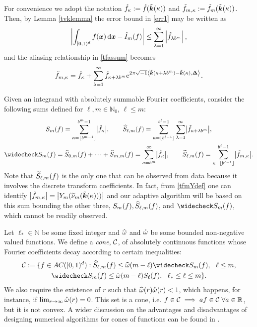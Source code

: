 \documentclass[graybox]{svmult}
\newcommand{\R}{\mathbb{R}} %
\newcommand{\N}{\mathbb{N}} %
\newcommand{\bsx}{\boldsymbol{x}}    %
\newcommand{\bsDelta}{\boldsymbol{\Delta}}    %
\begin{document}
For convenience we adopt the notation $\hat{f}_{\kappa} :=\hat{f}(\tilde{\boldsymbol{k}}(\kappa))$ and $\tilde{f}_{m,\kappa} := \tilde{f}_m(\tilde{\boldsymbol{k}}(\kappa))$. Then, by Lemma  \ref{tvklemma} the error bound in \eqref{err1} may be written as
\begin{equation}
\biggabs{ \int_{\cube} f(\bsx) \, \D \bsx - \hI_m(f)} 
\le \sum_{\lambda=1}^{\infty} \left \lvert \hf_{\lambda b^m}\right \rvert, \label{err2}
\end{equation}
and the aliasing relationship in \eqref{tfassum} becomes
\begin{align}
\tf_{m,\kappa} =\hf_{\kappa} + \sum_{\lambda=1}^{\infty} \hf_{\kappa+\lambda b^{m}} \E^{2 \pi \sqrt{-1} \ip{\tvk(\kappa+\lambda b^{m}) - \tvk(\kappa)}{\bsDelta}}. \label{tfassumc}
\end{align}

Given an integrand with absolutely summable Fourier coefficients, consider the following sums defined for $\ell,m \in \N_0$, $\ell \le m$:
\begin{gather*}
S_m(f) =  \sum_{\kappa=\left \lfloor b^{m-1} \right \rfloor}^{b^{m}-1} \bigabs{\hf_{\kappa}}, \qquad 
\hS_{\ell,m}(f)  = \sum_{\kappa=\left \lfloor b^{\ell-1} \right \rfloor}^{b^{\ell}-1} \sum_{\lambda=1}^{\infty} \bigabs{ \hf_{\kappa+\lambda b^{m}}}, \\
\wcS_m(f)=\hS_{0,m}(f) + \cdots + \hS_{m,m}(f)=
\sum_{\kappa=b^{m}}^{\infty} \bigabs{\hf_{\kappa}}, \qquad
\tS_{\ell,m}(f) = \sum_{\kappa=\left \lfloor b^{\ell-1}\right \rfloor}^{b^{\ell}-1} \bigabs{\tf_{m,\kappa}}.
\end{gather*}
Note that $\widetilde{S}_{\ell,m}(f)$ is the only one that can be observed from data because it involves the discrete transform coefficients. In fact, from \eqref{tfmYdef} one can identify $\bigl \lvert \tilde{f}_{m,\kappa} \bigr \rvert = \bigl \lvert Y_m(\widetilde{\nu}_m(\tilde{\boldsymbol{k}}(\kappa))) \bigr \rvert$ and our adaptive algorithm will be based on this sum bounding the other three, $S_m(f),\widehat{S}_{\ell,m}(f)$, and $\wcS_m(f)$, which cannot be readily observed. 

Let  $\ell_* \in \N$ be some fixed integer and $\widehat{\omega}$ and $\mathring{\omega}$ be some bounded non-negative valued functions.  We define a \emph{cone}, $\mathcal{C}$, of absolutely continuous functions whose Fourier coefficients decay according to certain inequalities:
\begin{multline} \label{conecond}
\cc:=\{f \in AC(\cube) : \hS_{\ell,m}(f) \le \homega(m-\ell) \wcS_m(f),\ \ \ell \le m, \\
\wcS_m(f) \le \wcomega(m-\ell) S_{\ell}(f),\ \  \ell_* \le \ell \le m\}.
\end{multline}
We also require the existence of $r$ such that $\widehat{\omega}(r) \mathring{\omega}(r)<1$, which happens, for instance, if $\lim_{r\rightarrow\infty}\mathring{\omega}(r)=0$. This set is a cone, i.e. $f \in \cc \implies af \in \cc\;\forall a\in\R$, but it is not convex. A wider discussion on the advantages and disadvantages of designing numerical algorithms for cones of functions can be found in \cite{Clancy201421}.
\end{document}
